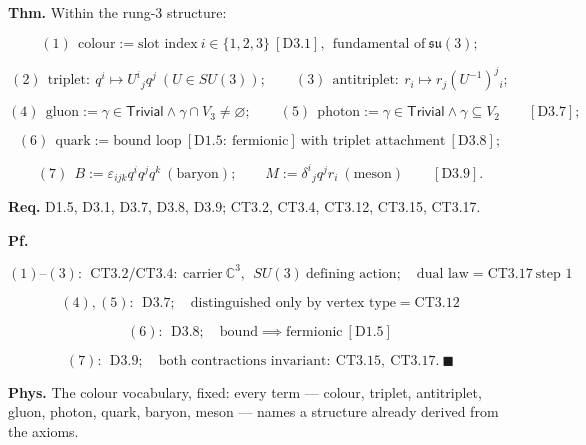 \begin{theorem}\label{tag:CT3-11}
\textbf{Thm.} Within the rung-3 structure:

\[
(1)\ \ \text{colour}:=\text{slot index}\ i\in\{1,2,3\}\ [\mathrm{D3.1}],\ \ \text{fundamental of}\ \mathfrak{su}(3);
\]

\[
(2)\ \ \text{triplet}:\ q^i\mapsto U^i{}_jq^j\ (U\in SU(3));\qquad
(3)\ \ \text{antitriplet}:\ r_i\mapsto r_j(U^{-1})^j{}_i;
\]

\[
(4)\ \ \text{gluon}:=\gamma\in\mathsf{Trivial}\wedge\gamma\cap V_3\ne\varnothing;\qquad
(5)\ \ \text{photon}:=\gamma\in\mathsf{Trivial}\wedge\gamma\subseteq V_2\qquad[\mathrm{D3.7}];
\]

\[
(6)\ \ \text{quark}:=\text{bound loop}\ [\mathrm{D1.5}:\ \text{fermionic}]\ \text{with triplet attachment}\ [\mathrm{D3.8}];
\]

\[
(7)\ \ B:=\varepsilon_{ijk}q^iq^jq^k\ (\text{baryon});\qquad M:=\delta^i{}_jq^jr_i\ (\text{meson})\qquad[\mathrm{D3.9}].
\]

\textbf{Req.} D1.5, D3.1, D3.7, D3.8, D3.9; CT3.2, CT3.4, CT3.12, CT3.15, CT3.17.

\textbf{Pf.}

\[
(1)\text{--}(3):\ \ \mathrm{CT3.2}/\mathrm{CT3.4}:\ \text{carrier}\ \mathbb C^3,\ \ SU(3)\ \text{defining action};\quad\text{dual law}=\mathrm{CT3.17}\ \text{step 1}
\]

\[
(4),(5):\ \ \mathrm{D3.7};\quad\text{distinguished only by vertex type}=\mathrm{CT3.12}
\]

\[
(6):\ \ \mathrm{D3.8};\quad\text{bound}\implies\text{fermionic}\ [\mathrm{D1.5}]
\]

\[
(7):\ \ \mathrm{D3.9};\quad\text{both contractions invariant}:\ \mathrm{CT3.15},\ \mathrm{CT3.17}.\ \blacksquare
\]

\textbf{Phys.} The colour vocabulary, fixed: every term — colour, triplet, antitriplet, gluon, photon, quark, baryon, meson — names a structure already derived from the axioms.

\end{theorem}

